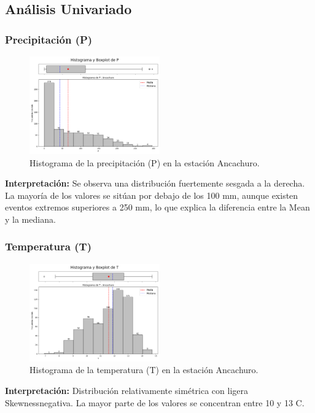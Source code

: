\subsection{Análisis Univariado}

\subsubsection*{Precipitación (P)}
\begin{figure}[H]
\centering
\includegraphics[width=0.5\textwidth]{resultados/por_estacion_meteorologica/Ancachuro/P_histograma.png}
\caption{Histograma de la precipitación (P) en la estación Ancachuro.}
\label{fig:ancachuro_P}
\end{figure}
\textbf{Interpretación:} Se observa una distribución fuertemente sesgada a la derecha. La mayoría de los valores se sitúan por debajo de los 100 mm, aunque existen eventos extremos superiores a 250 mm, lo que explica la diferencia entre la Mean y la mediana.

\subsubsection*{Temperatura (T)}
\begin{figure}[H]
\centering
\includegraphics[width=0.5\textwidth]{resultados/por_estacion_meteorologica/Ancachuro/T_histograma.png}
\caption{Histograma de la temperatura (T) en la estación Ancachuro.}
\label{fig:ancachuro_T}
\end{figure}
\textbf{Interpretación:} Distribución relativamente simétrica con ligera Skewnessnegativa. La mayor parte de los valores se concentran entre 10 y 13 \textdegree C.


